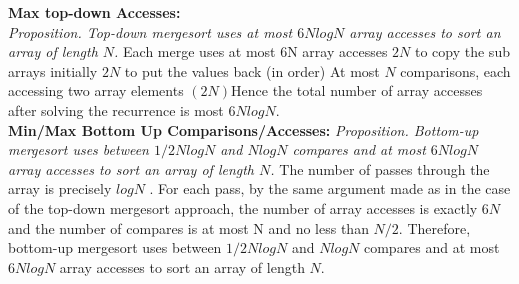 \documentclass[letterpaper, 8pt]{extarticle}
\begin{document}
\begin{multicols*}{4}
  \textbf{Max top-down Accesses:}\\
  \textit{Proposition. Top-down mergesort uses at most $6N log N$ array accesses to sort an array of length $N$.} Each merge uses at most 6N array accesses
  $2N$ to copy the sub arrays initially
  $2N$ to put the values back (in order)
  At most $N$ comparisons, each accessing two array elements $(2N)$Hence the total number of array accesses after solving the recurrence is most $6N log N$.\\
  \textbf{Min/Max Bottom Up Comparisons/Accesses:}
  \textit{Proposition. Bottom-up mergesort uses between $1/2N log N$ and $N log N$
  compares and at most $6N log N$ array accesses to sort an array of length $N$.}
  The number of passes through the array is precisely $log N$ . For each pass, by the same argument made as in the case of the
  top-down mergesort approach, the number of array accesses is exactly $6N$ and the number of compares is at most N and no less than $N/2$. Therefore, bottom-up mergesort uses between $1/2N log N$ and $N log N$ compares and at most $6N log N$ array accesses to sort an array of length
  $N$.\\


\end{multicols*}
\end{document}
